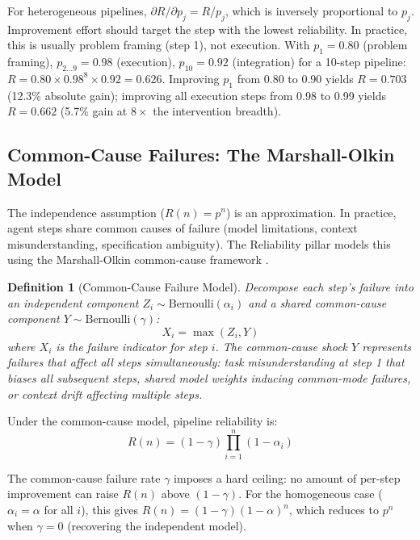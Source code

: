 \documentclass[11pt, a4paper, logo, copyright]{googledeepmind}
\newtheorem{definition}{Definition}[section]
\begin{document}
For heterogeneous pipelines, $\partial R / \partial p_j = R / p_j$, which is inversely proportional to $p_j$. Improvement effort should target the step with the lowest reliability. In practice, this is usually problem framing (step 1), not execution. With $p_1 = 0.80$ (problem framing), $p_{2 \ldots 9} = 0.98$ (execution), $p_{10} = 0.92$ (integration) for a 10-step pipeline: $R = 0.80 \times 0.98^8 \times 0.92 = 0.626$. Improving $p_1$ from 0.80 to 0.90 yields $R = 0.703$ (12.3\% absolute gain); improving all execution steps from 0.98 to 0.99 yields $R = 0.662$ (5.7\% gain at $8\times$ the intervention breadth).

\subsection{Common-Cause Failures: The Marshall-Olkin Model}

The independence assumption ($R(n) = p^n$) is an approximation. In practice, agent steps share common causes of failure (model limitations, context misunderstanding, specification ambiguity). The Reliability pillar models this using the Marshall-Olkin common-cause framework \citep{marshall1967multivariate}.

\begin{definition}[Common-Cause Failure Model]
\label{def:common-cause}
Decompose each step's failure into an independent component $Z_i \sim \text{Bernoulli}(\alpha_i)$ and a shared common-cause component $Y \sim \text{Bernoulli}(\gamma)$:
\begin{equation}
    X_i = \max(Z_i, Y)
\end{equation}
where $X_i$ is the failure indicator for step $i$. The common-cause shock $Y$ represents failures that affect all steps simultaneously: task misunderstanding at step 1 that biases all subsequent steps, shared model weights inducing common-mode failures, or context drift affecting multiple steps.
\end{definition}

Under the common-cause model, pipeline reliability is:
\begin{equation}
    R(n) = (1 - \gamma) \prod_{i=1}^{n} (1 - \alpha_i)
\end{equation}

The common-cause failure rate $\gamma$ imposes a hard ceiling: no amount of per-step improvement can raise $R(n)$ above $(1 - \gamma)$. For the homogeneous case ($\alpha_i = \alpha$ for all $i$), this gives $R(n) = (1 - \gamma)(1 - \alpha)^n$, which reduces to $p^n$ when $\gamma = 0$ (recovering the independent model).
\end{document}
